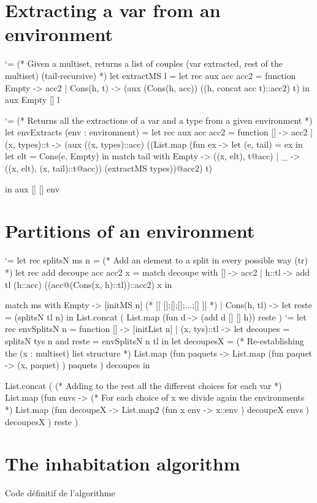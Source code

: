 \documentclass{article}
\let\origlstlisting=\lstlisting
\let\endoriglstlisting=\endlstlisting
\renewenvironment{lstlisting}
{\mathcode`\-=\hyphenmathcode
    \everymath{}\mathsurround=0pt\origlstlisting}
{\endoriglstlisting}
\begin{document}
\newpage



\newpage
\appendix
\section{Extracting a var from an environment}
\label{a_extract}
\begin{lstlisting}
(* Given a multiset, returns a list of couples
(var extracted, rest of the multiset) (tail-recursive) *)
let extractMS l =
  let rec aux acc acc2 = function
    Empty -> acc2
    | Cons(h, t) -> 
  (aux (Cons(h, acc)) ((h, concat acc t)::acc2) t)
in aux Empty [] l
\end{lstlisting}


\begin{lstlisting}
(* Returns all the extractions of a var and a type 
from a given  environment *)
let envExtracts (env : environment) = 
  let rec aux acc acc2 = function
    [] -> acc2
    | (x, types)::t -> 
        (aux ((x, types)::acc) ((List.map (fun ex -> 
    let (e, tail) = ex in 
    let elt = Cons(e, Empty) in 
    match tail with
      Empty -> ((x, elt), t@acc)
      | _ -> 
((x, elt), (x, tail)::t@acc)) (extractMS types))@acc2) t) 

  in aux [] [] env
\end{lstlisting}

\newpage
\section{Partitions of an environment}
\label {a_part}
\begin{lstlisting}
let rec splitsN ms n = 
  (* Add an element to a split in every possible way (tr) *)
  let rec add decoupe acc acc2 x = match decoupe with 
    [] -> acc2
    | h::tl -> 
        add tl (h::acc) ((acc@(Cons(x, h)::tl))::acc2) x
  in
   
  match ms with
    Empty -> [initMS n] (* [[ [];[];[];...;[] ]] *)
    | Cons(h, tl) -> let reste = (splitsN tl n) in
       List.concat (
         List.map (fun d ->  (add d [] [] h)) reste
       )
\end{lstlisting}
\begin{lstlisting}
let rec envSplitsN n = function
  [] -> [initList n]
  | (x, tys)::tl -> let decoupes = splitsN tys n 
                       and reste = envSplitsN n tl in
    let decoupesX = 
      (* Re-establishing 
          the (x : multiset) list structure *)
      List.map (fun paquets -> 
        List.map (fun paquet -> 
            (x, paquet)
        ) paquets
      ) decoupes in
            
    List.concat (
      (* Adding to the rest all the different
          choices for each var *)
      List.map (fun envs -> 
        (* For each choice of x 
            we divide again the environments *)
        List.map (fun decoupeX -> 
          List.map2 (fun x env -> 
            x::env
          ) decoupeX envs
        ) decoupesX
      ) reste
    )
\end{lstlisting}

\newpage
\section{The inhabitation algorithm}
Code définitif de l'algorithme
\end{document}
